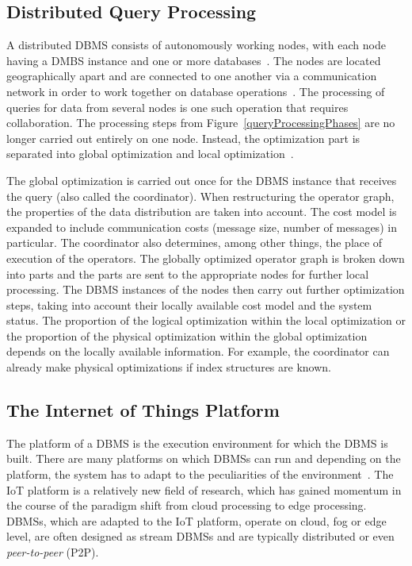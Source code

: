 \documentclass[english,version-2019-11]{uzl-thesis}
\begin{document}
\subsection{Distributed Query Processing}
A distributed DBMS consists of autonomously working nodes, with each node having a DMBS instance and one or more databases~\cite{Kemper}. The nodes are located geographically apart and are connected to one another via a communication network in order to work together on database operations~\cite{Kemper}. The processing of queries for data from several nodes is one such operation that requires collaboration. The processing steps from Figure~\ref{queryProcessingPhases} are no longer carried out entirely on one node.
Instead, the optimization part is separated into global optimization and local optimization~\cite{Rahm}.

The global optimization is carried out once for the DBMS instance that receives the query (also called the coordinator). When restructuring the operator graph, the properties of the data distribution are taken into account. The cost model is expanded to include communication costs (message size, number of messages) in particular. The coordinator also determines, among other things, the place of execution of the operators. The globally optimized operator graph is broken down into parts and the parts are sent to the appropriate nodes for further local processing. The DBMS instances of the nodes then carry out further optimization steps, taking into account their locally available cost model and the system status.
The proportion of the logical optimization within the local optimization or the proportion of the physical optimization within the global optimization depends on the locally available information. For example, the coordinator can already make physical optimizations if index structures are known.~\cite{Rahm}

\subsection{The Internet of Things Platform}
The platform of a DBMS is the execution environment for which the DBMS is built. There are many platforms on which DBMSs can run and depending on the platform, the system has to adapt to the peculiarities of the environment~\cite{HM3P}. The IoT platform is a relatively new field of research, which has gained momentum in the course of the paradigm shift from cloud processing to edge processing. DBMSs, which are adapted to the IoT platform, operate on cloud, fog or edge level, are often designed as stream DBMSs and are typically distributed or even \emph{peer-to-peer} (P2P).
\end{document}
